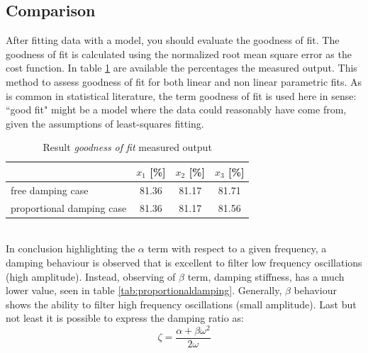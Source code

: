 \subsection{Comparison}
\label{subsec:comparison}
After fitting data with a model, you should evaluate the goodness of fit. 
The goodness of fit is calculated using the normalized root mean square error 
as the cost function.
In table \ref{tab:goodoffit} are available the percentages the measured output.
This method to assess goodness of fit for both linear and non linear parametric 
fits.
As is common in statistical literature, the term goodness of fit is used here 
in sense: ``good fit" might be a model where the data could reasonably have 
come from, given the assumptions of least-squares fitting.
\begin{table}[ht]
\centering
\begin{tabular}{lccc}
	\toprule
		 & $x_1$ [\%] & $x_2$ [\%] & $x_3$ [\%]\\
	\midrule
	free damping case & 81.36 & 81.17 & 81.71 \\
	proportional damping case & 81.36 & 81.17 & 81.56 \\
	\bottomrule
\end{tabular}
\caption{Result \emph{goodness of fit} measured output}
\label{tab:goodoffit}
\end{table}
\\In conclusion highlighting the \(\alpha\) term with respect to a given frequency, 
a damping behaviour is observed that is excellent to filter low frequency 
oscillations (high amplitude).
Instead, observing of  \(\beta\) term, damping stiffness, has a much lower 
value, seen in table \ref{tab:proportionaldamping}. 
Generally, \(\beta\) behaviour shows the ability to filter high frequency 
oscillations (small amplitude).
Last but not least it is possible to express the damping ratio as:
\begin{equation}
\label{eq:dampingratio}
\zeta = \frac{\alpha + \beta \omega^2}{2\omega}
\end{equation}
%
